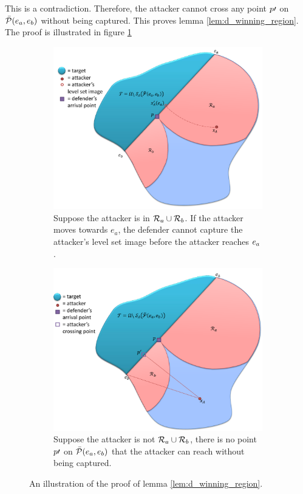 \begin{IEEEproof}
This is a contradiction. Therefore, the attacker cannot cross any point $p\prime$ on $\bar{\mathcal{P}}(e_a,e_b)$ without being captured. This proves lemma \ref{lem:d_winning_region}. The proof is illustrated in figure \ref{fig:lemma1}
\end{IEEEproof}

\begin{figure}[h]
\centering
	\begin{subfigure}{0.45\textwidth}
	\centering
	\includegraphics[width=\textwidth]{"fig/attacker in Ra"}
	\caption{Suppose the attacker is in $\mathcal{R}_a\cup\mathcal{R}_b$. If the attacker moves towards $e_a$, the defender cannot capture the attacker's level set image before the attacker reaches $e_a$.}
	\end{subfigure} \quad
	\begin{subfigure}{0.45\textwidth}
	\centering
	\includegraphics[width=\textwidth]{"fig/attacker outside Ra U Rb"}
	\caption{Suppose the attacker is not $\mathcal{R}_a\cup\mathcal{R}_b$, there is no point $p\prime$ on $\bar{\mathcal{P}}(e_a,e_b)$ that the attacker can reach without being captured.}
	\end{subfigure}
\caption{An illustration of the proof of lemma \ref{lem:d_winning_region}.}
\label{fig:lemma1}
\end{figure}

